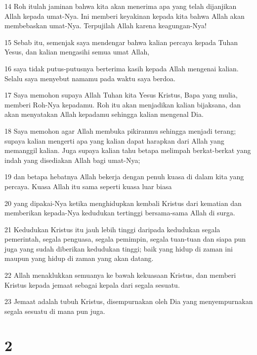 \par 14 Roh itulah jaminan bahwa kita akan menerima apa yang telah dijanjikan Allah kepada umat-Nya. Ini memberi keyakinan kepada kita bahwa Allah akan membebaskan umat-Nya. Terpujilah Allah karena keagungan-Nya!
\par 15 Sebab itu, semenjak saya mendengar bahwa kalian percaya kepada Tuhan Yesus, dan kalian mengasihi semua umat Allah,
\par 16 saya tidak putus-putusnya berterima kasih kepada Allah mengenai kalian. Selalu saya menyebut namamu pada waktu saya berdoa.
\par 17 Saya memohon supaya Allah Tuhan kita Yesus Kristus, Bapa yang mulia, memberi Roh-Nya kepadamu. Roh itu akan menjadikan kalian bijaksana, dan akan menyatakan Allah kepadamu sehingga kalian mengenal Dia.
\par 18 Saya memohon agar Allah membuka pikiranmu sehingga menjadi terang; supaya kalian mengerti apa yang kalian dapat harapkan dari Allah yang memanggil kalian. Juga supaya kalian tahu betapa melimpah berkat-berkat yang indah yang disediakan Allah bagi umat-Nya;
\par 19 dan betapa hebatnya Allah bekerja dengan penuh kuasa di dalam kita yang percaya. Kuasa Allah itu sama seperti kuasa luar biasa
\par 20 yang dipakai-Nya ketika menghidupkan kembali Kristus dari kematian dan memberikan kepada-Nya kedudukan tertinggi bersama-sama Allah di surga.
\par 21 Kedudukan Kristus itu jauh lebih tinggi daripada kedudukan segala pemerintah, segala penguasa, segala pemimpin, segala tuan-tuan dan siapa pun juga yang sudah diberikan kedudukan tinggi; baik yang hidup di zaman ini maupun yang hidup di zaman yang akan datang.
\par 22 Allah menaklukkan semuanya ke bawah kekuasaan Kristus, dan memberi Kristus kepada jemaat sebagai kepala dari segala sesuatu.
\par 23 Jemaat adalah tubuh Kristus, disempurnakan oleh Dia yang menyempurnakan segala sesuatu di mana pun juga.

\chapter{2}

